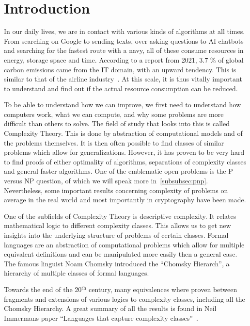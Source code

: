 \chapter{Introduction}\label{ch:intro}

In our daily lives, we are in contact with various kinds of algorithms at all times.
From searching on Google to sending texts, over asking questions to AI chatbots and searching for the fastest route with a navy, all of these consume resources in energy, storage space and time.
According to a report from 2021, 3.7 \% of global carbon emissions came from the IT domain, with an upward tendency.
This is similar to that of the airline industry~\cite{webFootprint}.
At this scale, it is thus vitally important to understand and find out if the actual resource consumption can be reduced.

To be able to understand how we can improve, we first need to understand how computers work, what we can compute, and why some problems are more difficult than others to solve.
The field of study that looks into this is called Complexity Theory.
This is done by abstraction of computational models and of the problems themselves.
It is then often possible to find classes of similar problems which allow for generalizations.
However, it has proven to be very hard to find proofs of either optimality of algorithms, separations of complexity classes and general faster algorithms.
One of the emblematic open problems is the P versus NP question, of which we will speak more in~\cref{subsubsec:pnp}.
Nevertheless, some important results concerning complexity of problems on average in the real world and most importantly in cryptography have been made.

One of the subfields of Complexity Theory is descriptive complexity.
It relates mathematical logic to different complexity classes.
This allows us to get new insights into the underlying structure of problems of certain classes.
Formal languages are an abstraction of computational problems which allow for multiple equivalent definitions and can be manipulated more easily then a general case.
The famous linguist Noam Chomsky introduced the ``Chomsky Hierarch'', a hierarchy of multiple classes of formal languages.

Towards the end of the 20$^{\text{th}}$ century, many equivalences where proven between fragments and extensions of various logics to complexity classes, including all the Chomsky Hierarchy.
A great summary of all the results is found in Neil Immermans paper ``Languages that capture complexity classes''~\cite{Immerman1987}.

